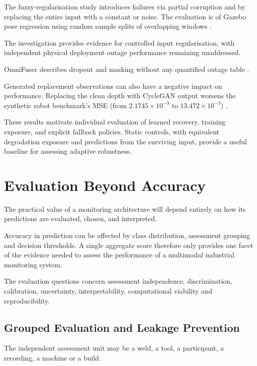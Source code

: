 The fuzzy-regularisation study introduces failures via partial corruption and by replacing the
entire input with a constant or noise. The evaluation is of Gazebo pose regression using random
sample splits of overlapping windows \parencite[Sections~III.A and IV.A--IV.B]{Altinses2023Fuzzy}.

The investigation provides evidence for controlled input regularisation, with independent physical
deployment outage performance remaining unaddressed.

OmniFuser describes dropout and masking without any quantified outage table \parencite[p.~10]{P021}.

Generated replacement observations can also have a negative impact on performance. Replacing the
clean depth with CycleGAN output worsens the synthetic robot benchmark's MSE (from $2.1745 \times
10^{-3}$ to $13.472 \times 10^{-3}$) \parencite[Table~7]{Altinses2025Performance}.

These results motivate individual evaluation of learned recovery, training exposure, and explicit
fallback policies. Static controls, with equivalent degradation exposure and predictions from the
surviving input, provide a useful baseline for assessing adaptive robustness.

\section{Evaluation Beyond Accuracy}

The practical value of a monitoring architecture will depend entirely on how its predictions are
evaluated, chosen, and interpreted.

Accuracy in prediction can be affected by class distribution, assessment grouping and decision
thresholds. A single aggregate score therefore only provides one facet of the evidence needed to
assess the performance of a multimodal industrial monitoring system.

The evaluation questions concern assessment independence, discrimination, calibration, uncertainty, interpretability, computational viability and reproducibility.

\subsection{Grouped Evaluation and Leakage Prevention}

The independent assessment unit may be a weld, a tool, a participant, a recording, a machine or a
build.

